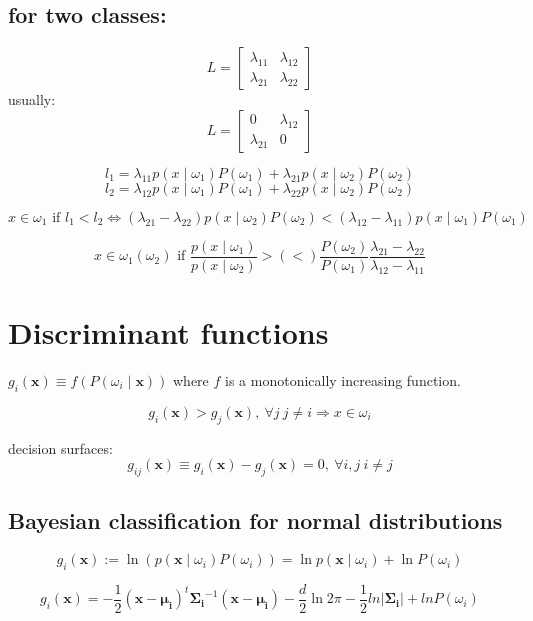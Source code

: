 \documentclass{report}
\begin{document}
\subsection*{for two classes:}
\[L = \begin{bmatrix}
	\lambda_{11} & \lambda_{12} \\
	\lambda_{21} & \lambda_{22}
\end{bmatrix}\]
usually:
\[L = \begin{bmatrix}
	0 & \lambda_{12} \\
	\lambda_{21} & 0
\end{bmatrix}\]

\[l_1 = \lambda_{11} p(x \mid \omega_1)P(\omega_1) + \lambda_{21} p(x \mid \omega_2)P(\omega_2)\]
\[l_2 = \lambda_{12} p(x \mid \omega_1)P(\omega_1) + \lambda_{22} p(x \mid \omega_2)P(\omega_2)\]

\[x \in \omega_1 \text{ if } l_1 < l_2 \Leftrightarrow (\lambda_{21}-\lambda_{22}) p(x \mid \omega_2)P(\omega_2) < (\lambda_{12}-\lambda_{11}) p(x \mid \omega_1)P(\omega_1)\]

\[x \in \omega_1 (\omega_2) \text{ if } \frac{p(x \mid \omega_1)}{p(x \mid \omega_2)} > (<) \frac{P(\omega_2)}{P(\omega_1)}\frac{\lambda_{21}-\lambda_{22}}{\lambda_{12}-\lambda_{11}}\]

\section{Discriminant functions}
$g_i (\symbf{x}) \equiv f(P(\omega_i \mid \symbf{x}))$ where $f$ is a monotonically increasing function.

\[g_i(\symbf{x}) > g_j(\symbf{x}),\ \forall j\ j \neq i \Rightarrow x \in \omega_i\]

decision surfaces:
\[g_{ij}(\symbf{x}) \equiv g_i(\symbf{x}) - g_j(\symbf{x}) = 0,\ \forall i, j\ i \neq j\]

\subsection*{Bayesian classification for normal distributions}

\[g_i(\symbf{x}) := \ln (p(\symbf{x} \mid \omega_i) P(\omega_i)) = \ln p(\symbf{x} \mid \omega_i) + \ln P(\omega_i)\]

\[g_i(\symbf{x}) = -\frac{1}{2} (\symbf{x} - \symbf{\mu_i})^t \symbf{\Sigma_i}^{-1} (\symbf{x} - \symbf{\mu_i}) - \frac{d}{2}\ln2\pi - \frac{1}{2} ln |\symbf{\Sigma_i}| + ln P(\omega_i)\]
\end{document}
